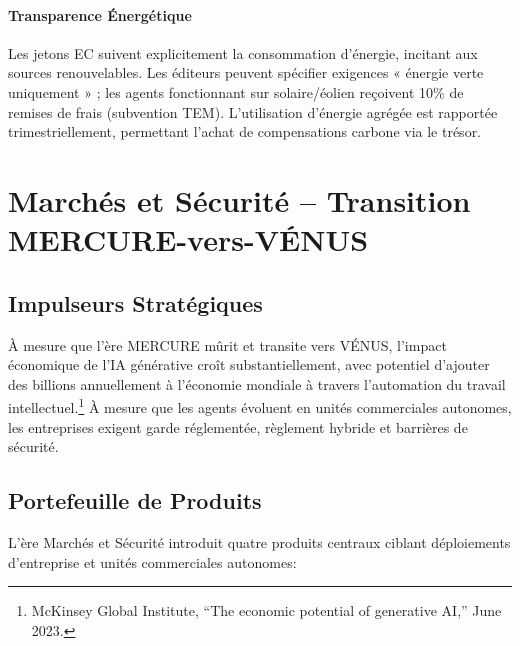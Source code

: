 \documentclass[11pt]{article}
\begin{document}
\paragraph{Transparence Énergétique} Les jetons EC suivent explicitement la consommation d'énergie, incitant aux sources renouvelables. Les éditeurs peuvent spécifier exigences « énergie verte uniquement » ; les agents fonctionnant sur solaire/éolien reçoivent 10\% de remises de frais (subvention TEM). L'utilisation d'énergie agrégée est rapportée trimestriellement, permettant l'achat de compensations carbone via le trésor.

\section{Marchés et Sécurité -- Transition MERCURE-vers-VÉNUS}
\subsection{Impulseurs Stratégiques}
À mesure que l'ère MERCURE mûrit et transite vers VÉNUS, l'impact économique de l'IA générative croît substantiellement, avec potentiel d'ajouter des billions annuellement à l'économie mondiale à travers l'automation du travail intellectuel.\footnote{McKinsey Global Institute, ``The economic potential of generative AI,'' June 2023.} À mesure que les agents évoluent en unités commerciales autonomes, les entreprises exigent garde réglementée, règlement hybride et barrières de sécurité.

\subsection{Portefeuille de Produits}
L'ère Marchés et Sécurité introduit quatre produits centraux ciblant déploiements d'entreprise et unités commerciales autonomes:
\end{document}
